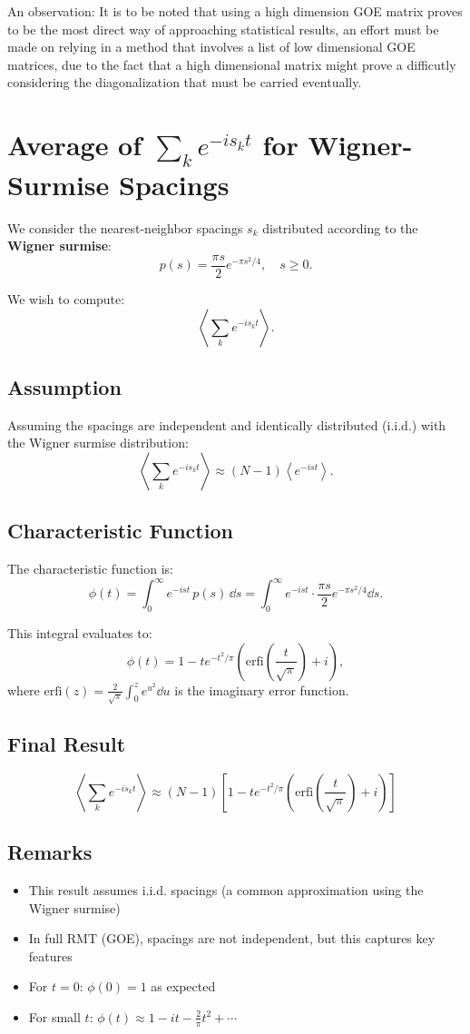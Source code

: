 \documentclass[10pt,a4paper]{article}
\begin{document}
An observation: It is to be noted that using a high dimension GOE matrix proves to be the most direct way of approaching statistical results,
 an effort must be made on relying in a method that involves a list of low dimensional GOE matrices, due to the fact that 
 a high dimensional matrix might prove a difficutly considering the diagonalization that must be carried eventually.

\appendix
\section{Average of $\sum_k e^{-i s_k t}$ for Wigner-Surmise Spacings}

We consider the nearest-neighbor spacings $s_k$ distributed according to the \textbf{Wigner surmise}:
\[
p(s) = \frac{\pi s}{2} e^{-\pi s^2 / 4}, \quad s \geq 0.
\]

We wish to compute:
\[
\left\langle \sum_k e^{-i s_k t} \right\rangle.
\]

\subsection*{Assumption}
Assuming the spacings are independent and identically distributed (i.i.d.) with the Wigner surmise distribution:
\[
\left\langle \sum_k e^{-i s_k t} \right\rangle \approx (N-1) \left\langle e^{-i s t} \right\rangle.
\]

\subsection*{Characteristic Function}
The characteristic function is:
\[
\phi(t) = \int_0^\infty e^{-i s t} \, p(s) \, \dd s = \int_0^\infty e^{-i s t} \cdot \frac{\pi s}{2} e^{-\pi s^2 / 4} \dd s.
\]

This integral evaluates to:
\[
\phi(t) = 1 - t e^{-t^2/\pi} \left( \mathrm{erfi}\left( \frac{t}{\sqrt{\pi}} \right) + i \right),
\]
where $\mathrm{erfi}(z) = \frac{2}{\sqrt{\pi}} \int_0^z e^{u^2} \dd u$ is the imaginary error function.

\subsection*{Final Result}
\[
\boxed{\left\langle \sum_k e^{-i s_k t} \right\rangle \approx (N-1)\left[1 - t e^{-t^{2}/\pi}\left(\mathrm{erfi}\left(\frac{t}{\sqrt{\pi}}\right) + i\right)\right]}
\]

\subsection*{Remarks}
\begin{itemize}
    \item This result assumes i.i.d. spacings (a common approximation using the Wigner surmise)
    \item In full RMT (GOE), spacings are not independent, but this captures key features
    \item For $t = 0$: $\phi(0) = 1$ as expected
    \item For small $t$: $\phi(t) \approx 1 - i t - \frac{2}{\pi} t^2 + \cdots$
\end{itemize}
\end{document}
